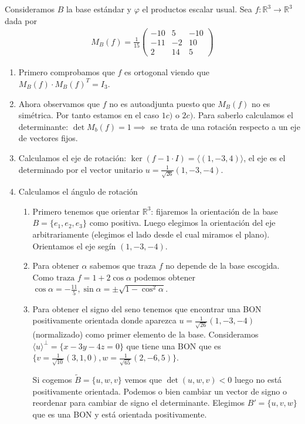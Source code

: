 \documentclass[14pt]{book}
\begin{document}
\begin{ej}
	Consideramos $B$ la base estándar y $\varphi$ el productos escalar usual. Sea $f:\mathbb{R}^3 \to \mathbb{R}^3$ dada por
	\begin{align*}
		M_B(f) = \frac{1}{15}\left(\begin{array}{ccc}
		-10 & 5 & -10 \\ -11 & -2 & 10 \\ 2 & 14 & 5
		\end{array}\right)
	\end{align*}
	
	\begin{enumerate}
		\item Primero comprobamos que $f$ es ortogonal viendo que $M_B(f) \cdot M_B(f)^T = I_3$.
		\item Ahora observamos que $f$ no es autoadjunta puesto que $M_B(f)$ no es simétrica. Por tanto estamos en el caso $1c)$ o $2c)$. Para saberlo calculamos el determinante: $\det M_b(f) = 1 \implies$ se trata de una rotación respecto a un eje de vectores fijos.
		\item Calculamos el eje de rotación: $\ker (f  - 1 \cdot I) = \langle (1, -3, 4)\rangle$, el eje es el determinado por el vector unitario $u = \frac{1}{\sqrt{26}} (1, -3, -4)$.
		\item Calculamos el ángulo de rotación
		\begin{enumerate}
			\item Primero tenemos que orientar $\mathbb{R}^3$: fijaremos la orientación de la base $B = \{e_1, e_2, e_3\}$ como positiva. Luego elegimos la orientación del eje arbitrariamente (elegimos el lado desde el cual miramos el plano). Orientamos el eje segín $(1, -3, -4)$.
			\item Para obtener $\alpha$ sabemos que $\text{traza } f$ no depende de la base escogida. Como $\text{traza }f = 1 + 2\cos \alpha$ podemos obtener $\cos \alpha = -\frac{11}{5}, \sin \alpha = \pm \sqrt{1 - \cos^2 \alpha}$.
			\item Para obtener el signo del seno tenemos que encontrar una BON positivamente orientada donde aparezca $u = \frac{1}{\sqrt{26}}(1, -3, -4)$ (normalizado) como primer elemento de la base. Consideramos $\langle u \rangle ^\perp = \{x - 3y - 4z = 0\}$ que tiene una BON que es $\{v = \frac{1}{\sqrt{10}}(3, 1, 0), w = \frac{1}{\sqrt{65}}(2, -6, 5)\}$.
			
			Si cogemos $\tilde{B} = \{u, w, v\}$ vemos que $\det(u, w, v)  < 0$ luego no está positivamente orientada. Podemos o bien cambiar un vector de signo o reordenar para cambiar de signo el determinante. Elegimos $B' = \{u, v, w\}$ que es una BON y está orientada positivamente.
			

\end{enumerate}
\end{enumerate}
\end{ej}
\end{document}
